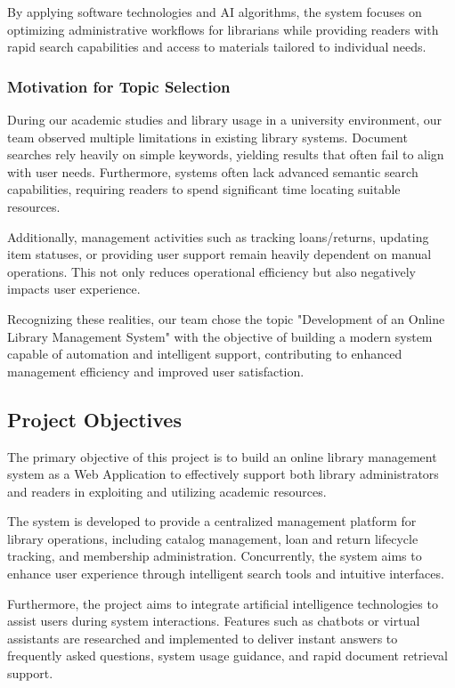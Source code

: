 By applying software technologies and AI algorithms, the system focuses on optimizing administrative workflows for librarians while providing readers with rapid search capabilities and access to materials tailored to individual needs.

\subsubsection{Motivation for Topic Selection}

During our academic studies and library usage in a university environment, our team observed multiple limitations in existing library systems. Document searches rely heavily on simple keywords, yielding results that often fail to align with user needs. Furthermore, systems often lack advanced semantic search capabilities, requiring readers to spend significant time locating suitable resources.

Additionally, management activities such as tracking loans/returns, updating item statuses, or providing user support remain heavily dependent on manual operations. This not only reduces operational efficiency but also negatively impacts user experience.

Recognizing these realities, our team chose the topic "Development of an Online Library Management System" with the objective of building a modern system capable of automation and intelligent support, contributing to enhanced management efficiency and improved user satisfaction.

\subsection{Project Objectives}

The primary objective of this project is to build an online library management system as a Web Application to effectively support both library administrators and readers in exploiting and utilizing academic resources.

The system is developed to provide a centralized management platform for library operations, including catalog management, loan and return lifecycle tracking, and membership administration. Concurrently, the system aims to enhance user experience through intelligent search tools and intuitive interfaces.

Furthermore, the project aims to integrate artificial intelligence technologies to assist users during system interactions. Features such as chatbots or virtual assistants are researched and implemented to deliver instant answers to frequently asked questions, system usage guidance, and rapid document retrieval support.

